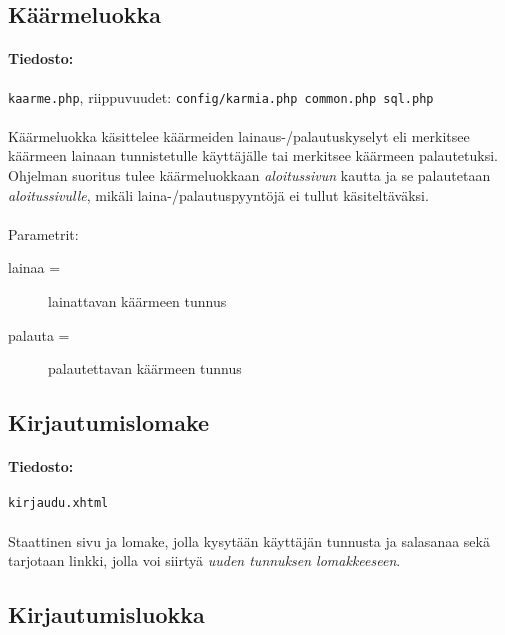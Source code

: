 \documentclass[11pt]{article}
\begin{document}

\subsection{Käärmeluokka}

\paragraph{Tiedosto:} \large{\texttt{kaarme.php}}, riippuvuudet: \texttt{config/karmia.php common.php sql.php}

\paragraph{} Käärmeluokka käsittelee käärmeiden lainaus-/palautuskyselyt eli merkitsee käärmeen lainaan tunnistetulle käyttäjälle tai merkitsee käärmeen palautetuksi. Ohjelman suoritus tulee käärmeluokkaan \emph{aloitussivun} kautta ja se palautetaan \emph{aloitussivulle}, mikäli laina-/palautuspyyntöjä ei tullut käsiteltäväksi.

\paragraph{} Parametrit:
\begin{description}
\item[lainaa =] lainattavan käärmeen tunnus
\item[palauta =] palautettavan käärmeen tunnus
\end{description}


\subsection{Kirjautumislomake}

\paragraph{Tiedosto:} \large{\texttt{kirjaudu.xhtml}}

\paragraph{} Staattinen sivu ja lomake, jolla kysytään käyttäjän tunnusta ja salasanaa sekä tarjotaan linkki, jolla voi siirtyä \emph{uuden tunnuksen lomakkeeseen}.


\subsection{Kirjautumisluokka}
\end{document}
